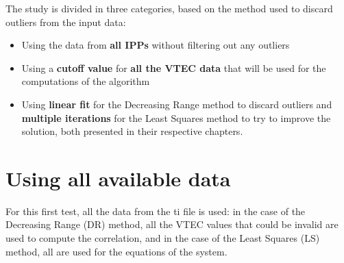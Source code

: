 The study is divided in three categories, based on the method used to discard outliers from the input data:

\begin{itemize}
	\item Using the data from \textbf{all IPPs} without filtering out any outliers
	\item Using a \textbf{cutoff value} for \textbf{all the VTEC data} that will be used for the computations of the algorithm
	\item Using \textbf{linear fit} for the Decreasing Range method to discard outliers and \textbf{multiple iterations} for the Least Squares method to try to improve the solution, both presented in their respective chapters.
\end{itemize}

\clearpage

\section{Using all available data}

For this first test, all the data from the ti file is used: in the case of the Decreasing Range (DR) method, all the VTEC values that could be invalid are used to compute the correlation, and in the case of the Least Squares (LS) method, all are used for the equations of the system.

